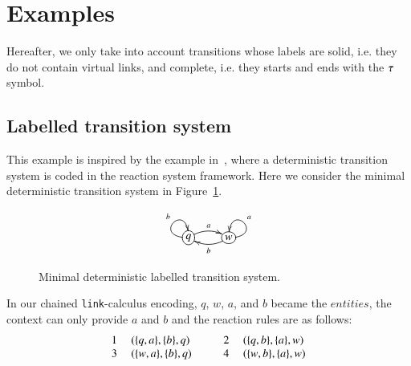 \section{Examples}
\label{ex:examples}
Hereafter, we only take into account transitions whose labels are solid, i.e. they do not contain 
virtual links, and   complete, i.e. they starts and ends with the $\tau$ symbol.\\

\subsection{Labelled transition system}
This example is inspired by the example in~\cite{BEMR11}, where
a deterministic transition system is coded in the reaction system
framework.
Here we consider the minimal deterministic transition system in Figure~\ref{fig:lts}.
\begin{figure}
\[
\xymatrix{
*+[o][F-]{q} \ar@/ ^/[r]^a \ar@(l,u)[]^b &
*+[o][F-]{w} \ar@/^/[l]^b \ar@(r,u)[]_a
}
\]
\caption{Minimal deterministic labelled transition system.}
\label{fig:lts}
\end{figure}
\noindent
In our chained {\tt link}-calculus encoding, $q$, $w$, $a$, and $b$ became the $entities$, the context can only provide $a$ and $b$ and the reaction rules are as follows:\\
\[
\begin{array}{cl@{\hspace{1cm}} cl}
1 \ &(\{q,a\},\{b\},q) & 2\ &(\{q,b\},\{a\},w)\\
3 \  &(\{w,a\},\{b\},q) & 4\ &(\{w,b\},\{a\},w)\\ 
\end{array}
\]
